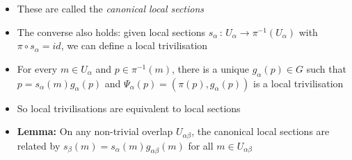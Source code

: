 \documentclass[12pt,a4paper]{article}
\numberwithin{equation}{section}
\begin{document}
\begin{itemize}
		\item These are called the \textit{canonical local sections}
		\item The converse also holds: given local sections $s_{\alpha}\,:\,U_{\alpha}\to \pi^{-1}(U_{\alpha})$ with $\pi\circ s_{\alpha}=id$, we can define a local trivilisation
		\item For every $m\in U_{\alpha}$ and $p\in \pi^{-1}(m)$, there is a unique $g_{\alpha}(p)\in G$ such that $p=s_{\alpha}(m)g_{\alpha}(p)$ and $\Psi_{\alpha}(p)=(\pi(p),g_{\alpha}(p))$ is a local trivilisation
		\item So local trivilisations are equivalent to local sections
		\item \textbf{Lemma:} On any non-trivial overlap $U_{\alpha\beta}$, the canonical local sections are related by $s_{\beta}(m)=s_{\alpha}(m)g_{\alpha\beta}(m)$ for all $m\in U_{\alpha\beta}$
	\end{itemize}
\end{document}
